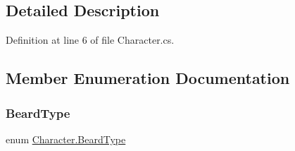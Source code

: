 \subsection{Detailed Description}


Definition at line 6 of file Character.\+cs.



\subsection{Member Enumeration Documentation}
\mbox{\label{class_character_afc1fe7f790870a92fe62d3e57296de81}} 
\subsubsection{\texorpdfstring{BeardType}{BeardType}}
{\footnotesize\ttfamily enum \mbox{\hyperlink{class_character_afc1fe7f790870a92fe62d3e57296de81}{Character.\+Beard\+Type}}\hspace{0.3cm}{\ttfamily [strong]}}

